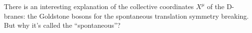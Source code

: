 There is an interesting explanation of the collective coordinates $X^\mu$ of the D-branes: 
the Goldstone bosons for the spontaneous translation symmetry breaking.
But why it's called the ``spontaneous''?

